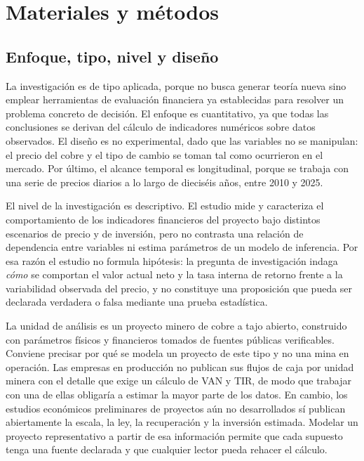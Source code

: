 %

\section{Materiales y métodos}

\subsection{Enfoque, tipo, nivel y diseño}

La investigación es de tipo aplicada, porque no busca generar teoría nueva sino
emplear herramientas de evaluación financiera ya establecidas para resolver un
problema concreto de decisión. El enfoque es cuantitativo, ya que todas las
conclusiones se derivan del cálculo de indicadores numéricos sobre datos
observados. El diseño es no experimental, dado que las variables no se
manipulan: el precio del cobre y el tipo de cambio se toman tal como ocurrieron
en el mercado. Por último, el alcance temporal es longitudinal, porque se trabaja
con una serie de precios diarios a lo largo de dieciséis años, entre 2010 y 2025.

El nivel de la investigación es descriptivo. El estudio mide y caracteriza el
comportamiento de los indicadores financieros del proyecto bajo distintos
escenarios de precio y de inversión, pero no contrasta una relación de
dependencia entre variables ni estima parámetros de un modelo de inferencia. Por
esa razón el estudio no formula hipótesis: la pregunta de investigación indaga
\emph{cómo} se comportan el valor actual neto y la tasa interna de retorno frente
a la variabilidad observada del precio, y no constituye una proposición que pueda
ser declarada verdadera o falsa mediante una prueba estadística.

La unidad de análisis es un proyecto minero de cobre a tajo abierto, construido
con parámetros físicos y financieros tomados de fuentes públicas verificables.
Conviene precisar por qué se modela un proyecto de este tipo y no una mina en
operación. Las empresas en producción no publican sus flujos de caja por unidad
minera con el detalle que exige un cálculo de VAN y TIR, de modo que trabajar con
una de ellas obligaría a estimar la mayor parte de los datos. En cambio, los
estudios económicos preliminares de proyectos aún no desarrollados sí publican
abiertamente la escala, la ley, la recuperación y la inversión estimada. Modelar
un proyecto representativo a partir de esa información permite que cada supuesto tenga una
fuente declarada y que cualquier lector pueda rehacer el cálculo.

